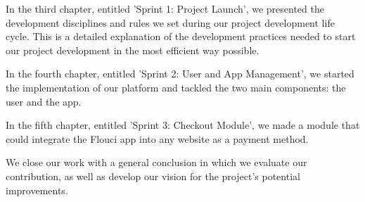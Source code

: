 \begin{spacing}{1.1}
In the third chapter, entitled 'Sprint 1:  Project Launch', we presented the development disciplines and rules we set during our project development life cycle. This is a detailed explanation of the development practices needed to start our project development in the most efficient way possible. 

In the fourth chapter, entitled 'Sprint 2:  User and App Management', we started the implementation of our platform and tackled the two main components: the user and the app.

In the fifth chapter, entitled 'Sprint 3:  Checkout Module', we made a module that could integrate the Flouci app into any website as a payment method.
 
We close our work with a general conclusion in which we evaluate our contribution, as well as develop our vision for the project's potential improvements.



\end{spacing}
